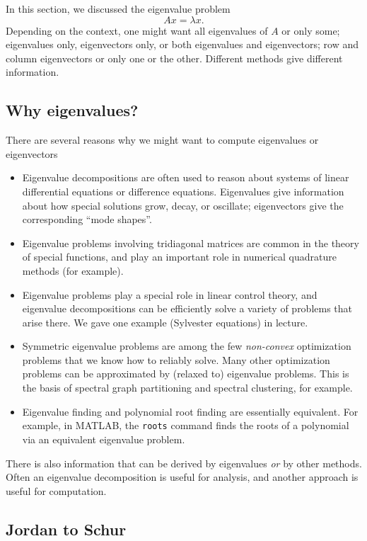 \documentclass[12pt, leqno]{article}
\begin{document}
In this section, we discussed the eigenvalue problem
\[
  A x = \lambda x.
\]
Depending on the context, one might want all eigenvalues of $A$ or
only some; eigenvalues only, eigenvectors only, or both eigenvalues
and eigenvectors; row and column eigenvectors or only one or the
other.  Different methods give different information.

\subsection{Why eigenvalues?}

There are several reasons why we might want to compute
eigenvalues or eigenvectors
\begin{itemize}
\item
  Eigenvalue decompositions are often used to reason about systems of
  linear differential equations or difference equations.  Eigenvalues
  give information about how special solutions grow, decay, or
  oscillate; eigenvectors give the corresponding ``mode shapes''.
\item
  Eigenvalue problems involving tridiagonal matrices are common in
  the theory of special functions, and play an important role in
  numerical quadrature methods (for example).
\item
  Eigenvalue problems play a special role in linear control theory,
  and eigenvalue decompositions can be efficiently solve a variety of
  problems that arise there.  We gave one example (Sylvester
  equations) in lecture.
\item
  Symmetric eigenvalue problems are among the few {\em non-convex}
  optimization problems that we know how to reliably solve.  Many
  other optimization problems can be approximated by (relaxed to)
  eigenvalue problems.  This is the basis of spectral graph
  partitioning and spectral clustering, for example.
\item
  Eigenvalue finding and polynomial root finding are essentially
  equivalent.  For example, in MATLAB, the {\tt roots} command finds
  the roots of a polynomial via an equivalent eigenvalue problem.
\end{itemize}
There is also information that can be derived by eigenvalues {\em or}
by other methods.  Often an eigenvalue decomposition is useful for
analysis, and another approach is useful for computation.

\subsection{Jordan to Schur}
\end{document}
